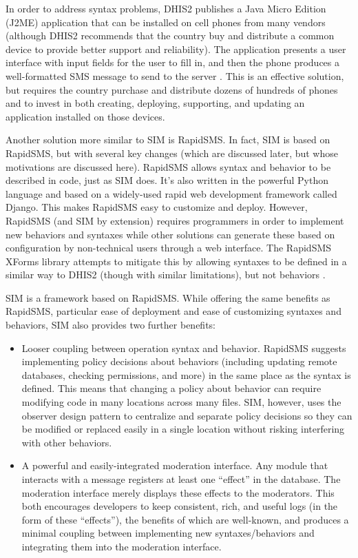 \documentclass{acm_proc_article-sp}
\begin{document}
In order to address syntax problems, DHIS2 publishes a Java Micro Edition (J2ME) application that can be installed on cell phones from many vendors (although DHIS2 recommends that the country buy and distribute a common device to provide better support and reliability). The application presents a user interface with input fields for the user to fill in, and then the phone produces a well-formatted SMS message to send to the server \cite{dhis2:smsoverview, dhis2:j2me}. This is an effective solution, but requires the country purchase and distribute dozens of hundreds of phones and to invest in both creating, deploying, supporting, and updating an application installed on those devices.

Another solution more similar to SIM is RapidSMS. In fact, SIM is based on RapidSMS, but with several key changes (which are discussed later, but whose motivations are discussed here). RapidSMS allows syntax and behavior to be described in code, just as SIM does. It's also written in the powerful Python language and based on a widely-used rapid web development framework called Django. This makes RapidSMS easy to customize and deploy. However, RapidSMS (and SIM by extension) requires programmers in order to implement new behaviors and syntaxes while other solutions can generate these based on configuration by non-technical users through a web interface. The RapidSMS XForms library attempts to mitigate this by allowing syntaxes to be defined in a similar way to DHIS2 (though with similar limitations), but not behaviors \cite{rapidsms:overview, rapidsms:xforms}.

SIM is a framework based on RapidSMS. While offering the same benefits as RapidSMS, particular ease of deployment and ease of customizing syntaxes and behaviors, SIM also provides two further benefits: 

\begin{itemize}
\item Looser coupling between operation syntax and behavior. RapidSMS suggests implementing policy decisions about behaviors (including updating remote databases, checking permissions, and more) in the same place as the syntax is defined. This means that changing a policy about behavior can require modifying code in many locations across many files. SIM, however, uses the observer design pattern to centralize and separate policy decisions so they can be modified or replaced easily in a single location without risking interfering with other behaviors.
\item A powerful and easily-integrated moderation interface. Any module that interacts with a message registers at least one ``effect'' in the database. The moderation interface merely displays these effects to the moderators. This both encourages developers to keep consistent, rich, and useful logs (in the form of these ``effects''), the benefits of which are well-known, and produces a minimal coupling between implementing new syntaxes/behaviors and integrating them into the moderation interface.
\end{itemize}
\end{document}
